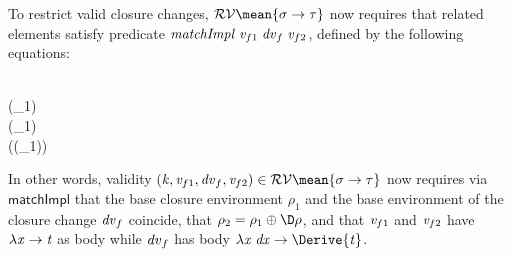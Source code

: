 To restrict valid closure changes,
\ensuremath{\mathcal{RV}\mean{\sigma\to \tau}} now requires that related elements
satisfy predicate \ensuremath{\Varid{matchImpl}\;\Varid{v}_{f1}\;\Varid{dv}_f\;\Varid{v}_{f2}}, defined
by the following equations:
\begin{hscode}\SaveRestoreHook
{}%
%
%
%
\>[3]{}\;{}\<[E]%
\\
\>[3]{}\<[5]%
\>[5]{}(\rho_{1})\;{}\<[E]%
\\
\>[3]{}\<[5]%
\>[5]{}(\rho_{1}\mathrel{\filleddiamond}\D\rho{})\;{}\<[E]%
\\
\>[3]{}\<[5]%
\>[5]{}((\rho_{1}\oplus \D\rho))\mathrel{=}\<[E]%
\\
\>[3]{}\;\text{\textunderscore}\;\text{\textunderscore}\;\text{\textunderscore}\mathrel{=}\<[E]%
\ColumnHook
\end{hscode}\resethooks
In other words, validity \ensuremath{(\Varid{k},\Varid{v}_{f1},\Varid{dv}_f,\Varid{v}_{f2})\in \mathcal{RV}\mean{\sigma\to \tau}} now requires
via \ensuremath{\mathsf{matchImpl}} that the base closure environment \ensuremath{\rho_{1}} and the base environment of the
closure change \ensuremath{\Varid{dv}_f} coincide, that \ensuremath{\rho_{2}\mathrel{=}\rho_{1}\oplus \D\rho},
and that \ensuremath{\Varid{v}_{f1}} and \ensuremath{\Varid{v}_{f2}} have \ensuremath{\lambda \Varid{x}\to \Varid{t}} as body while \ensuremath{\Varid{dv}_f} has body \ensuremath{\lambda \Varid{x}\;\Varid{dx}\to \Derive{\Varid{t}}}.

